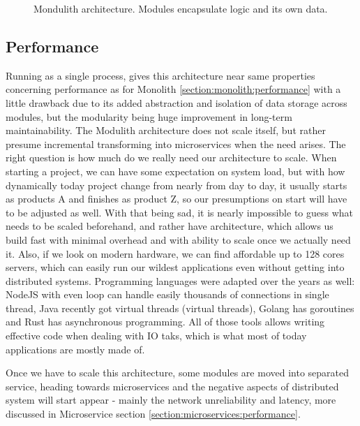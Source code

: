 \begin{figure}
    \centering
    
    \caption{Mondulith architecture. Modules encapsulate logic and its own data. \label{img:modulith_architecture}}
\end{figure}

\subsection{Performance}
Running as a single process, gives this architecture near same properties concerning performance as for Monolith \ref{section:monolith:performance} with a little drawback due to its added abstraction and isolation of data storage across modules, but the modularity being huge improvement in long-term maintainability. The Modulith architecture does not scale itself, but rather presume incremental transforming into microservices when the need arises. The right question is how much do we really need our architecture to scale. When starting a project, we can have some expectation on system load, but with how dynamically today project change from nearly from day to day, it usually starts as products A and finishes as product Z, so our presumptions on start will have to be adjusted as well. With that being sad, it is nearly impossible to guess what needs to be scaled beforehand, and rather have architecture, which allows us build fast with minimal overhead and with ability to scale once we actually need it. Also, if we look on modern hardware, we can find affordable up to 128 cores servers, which can easily run our wildest applications even without getting into distributed systems. Programming languages were adapted over the years as well: NodeJS with even loop can handle easily thousands of connections in single thread, Java recently got virtual threads (virtual threads), Golang has goroutines and Rust has asynchronous programming. All of those tools allows writing effective code when dealing with IO taks, which is what most of today applications are mostly made of.

Once we have to scale this architecture, some modules are moved into separated service, heading towards microservices and the negative aspects of distributed system will start appear - mainly the network unreliability and latency, more discussed in Microservice section \ref{section:microservices:performance}.


